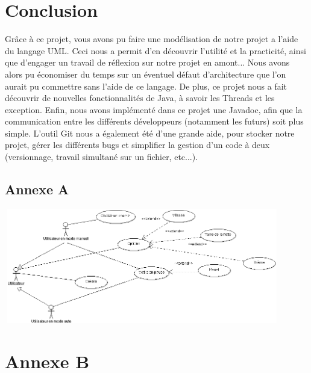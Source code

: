 \documentclass[a4paper, titlepage]{report}
\begin{document}
\chapter*{Conclusion}
Grâce à ce projet, vous avons pu faire une modélisation de notre projet a l'aide du langage UML. Ceci nous a permit d'en découvrir l'utilité et la practicité, ainsi que d'engager un travail de réflexion sur notre projet en amont... Nous avons alors pu économiser du temps sur un éventuel défaut d'architecture que l'on aurait pu commettre sans l'aide de ce langage. De plus, ce projet nous a fait découvrir de nouvelles fonctionnalités de Java, à savoir les Threads et les exception. Enfin, nous avons implémenté dans ce projet une Javadoc, afin que la communication entre les différents développeurs (notamment les futurs) soit plus simple. L'outil Git nous a également été d'une grande aide, pour stocker notre projet, gérer les différents bugs et simplifier la gestion d'un code à deux (versionnage, travail simultané sur un fichier, etc...).
\appendix
\begin{landscape}

\chapter*{Annexe A}
\includegraphics[width=455px, height=190px]{Images/CasUtilisation.PNG}
\end{landscape}
\chapter*{Annexe B}
\end{document}
